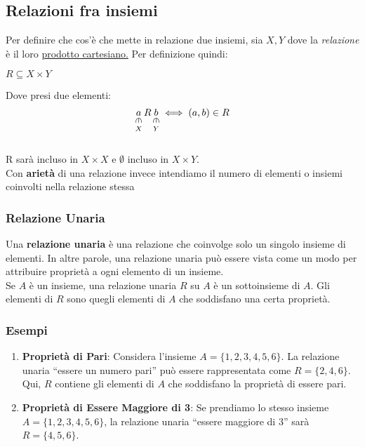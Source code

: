 \documentclass[article,12pt]{book}
\begin{document}
\begin{enumerate}
\begin{center}
\end{center}
\newpage
\subsection{Relazioni fra insiemi}
Per definire che cos'è che mette in relazione due insiemi, sia $X,Y$ dove la \textit{relazione} è il loro \hyperref[prodotto cartesiano]{prodotto cartesiano.}
Per definizione quindi:
    \begin{center}
        $R \subseteq X \times Y$
    \end{center}
Dove presi due elementi: \[
\underset{X}{\underset{\rotatebox[origin=c]{270}{$\in$}}{a}} \, R \, \underset{Y}{\underset{\rotatebox[origin=c]{270}{$\in$}}{b}} \iff (a,b) \in R
\] \\
R sarà incluso in $X \times X$ e $\emptyset$ incluso in $X \times Y$. \\
Con \textbf{arietà} di una relazione invece intendiamo il numero di elementi o insiemi coinvolti nella relazione stessa 
\
\subsubsection{Relazione Unaria}
Una \textbf{relazione unaria} è una relazione che coinvolge solo un singolo insieme di elementi. In altre parole, una relazione unaria può essere vista come un modo per attribuire proprietà a ogni elemento di un insieme.\\
Se \( A \) è un insieme, una relazione unaria \( R \) su \( A \) è un sottoinsieme di \( A \). Gli elementi di \( R \) sono quegli elementi di \( A \) che soddisfano una certa proprietà.

\subsubsection{Esempi}
\begin{enumerate}
    \item \textbf{Proprietà di Pari}: Considera l'insieme \( A = \{1, 2, 3, 4, 5, 6\} \). La relazione unaria ``essere un numero pari'' può essere rappresentata come \( R = \{2, 4, 6\} \). Qui, \( R \) contiene gli elementi di \( A \) che soddisfano la proprietà di essere pari.
    
    \item \textbf{Proprietà di Essere Maggiore di 3}: Se prendiamo lo stesso insieme \( A = \{1, 2, 3, 4, 5, 6\} \), la relazione unaria ``essere maggiore di 3'' sarà \( R = \{4, 5, 6\} \).
\end{enumerate}


\end{enumerate}
\end{document}
